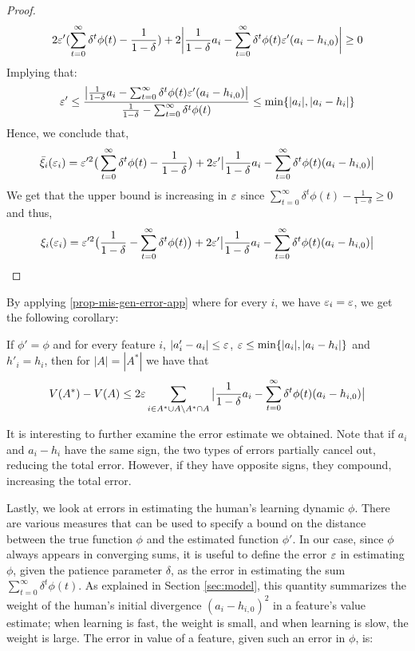 \begin{proof}
$$ 2 \varepsilon' ( \sum_{t=0}^\infty \delta^t \phi(t)- \frac{1}{1-\delta}) + 2\bigg|\frac{1}{1-\delta} a_i - \sum_{t=0}^\infty \delta^t \phi(t)\varepsilon'(a_i-h_{i,0})\bigg|\geq 0 $$
Implying that:
\begin{align*}
    \varepsilon' \leq \frac{\big|\frac{1}{1-\delta} a_i - \sum_{t=0}^\infty \delta^t \phi(t)\varepsilon'(a_i-h_{i,0})\big|}{\frac{1}{1-\delta} -\sum_{t=0}^\infty \delta^t \phi(t)} \leq \min\{|a_i|,|a_i-h_i|\}
\end{align*}
 Hence, we conclude that,
 \begin{align*}
\bar \xi_i(\varepsilon_i) = \varepsilon'^2\big(\sum_{t=0}^\infty \delta^t \phi(t) - \frac{1}{1-\delta}\big) +2\varepsilon' \big|\frac{1}{1-\delta} a_i - \sum_{t=0}^\infty \delta^t \phi(t)(a_i-h_{i,0})\big|
 \end{align*}
We get that the upper bound is increasing in $\varepsilon$ since $\sum_{t=0}^\infty \delta^t \phi(t) - \frac{1}{1-\delta} \geq 0$ and thus,
\begin{align*}
\xi_i(\varepsilon_i) = \varepsilon'^2\big(\frac{1}{1-\delta}-\sum_{t=0}^\infty \delta^t \phi(t)\big) + 2\varepsilon' \big|\frac{1}{1-\delta} a_i - \sum_{t=0}^\infty \delta^t \phi(t)(a_i-h_{i,0})\big|
\end{align*}
\end{proof}
By applying \cref{prop-mis-gen-error-app} where for every $i$, we have $\varepsilon_i=\varepsilon$, we get the following corollary: 
\begin{corollary}
If $\phi'=\phi$ and for every feature $i$, $|a'_i-a_i|\leq \varepsilon$, $ \varepsilon \leq \min\{|a_i|,|a_i-h_i|\}$ and $h'_i= h_i$, then for $|A|=|A^*|$ we have that
    \begin{align*}
        V(A^*)-V(A) \leq   2\varepsilon \sum_{i \in A^* \cup A \setminus A^* \cap A } \big|\frac{1}{1-\delta} a_i - \sum_{t=0}^\infty \delta^t \phi(t)(a_i-h_{i,0})\big|
    \end{align*}
\end{corollary}
It is interesting to further examine the error estimate we obtained. Note that if $a_i$ and $a_i - h_i$ have the same sign, the two types of errors partially cancel out, reducing the total error. However, if they have opposite signs, they compound, increasing the total error.


Lastly, we look at errors in estimating the 
human's learning dynamic $\phi$. There are various measures that can be used to specify a bound on the distance between the true function $\phi$ and the estimated function $\phi'$. In our case, since $\phi$ always appears in converging sums, it is useful to define the error $\varepsilon$ in estimating %
$\phi$, given the patience parameter $\delta$, as the error in estimating the sum $\sum_{t=0}^\infty \delta^t \phi(t)$. 
As explained in Section \ref{sec:model}, this quantity summarizes the weight of the human's initial divergence $(a_i - h_{i,0})^2$ in a feature's value estimate; when learning is fast, the weight is small, and when learning is slow, the weight is large. The error in value of a feature, given such an error in $\phi$, is: 

